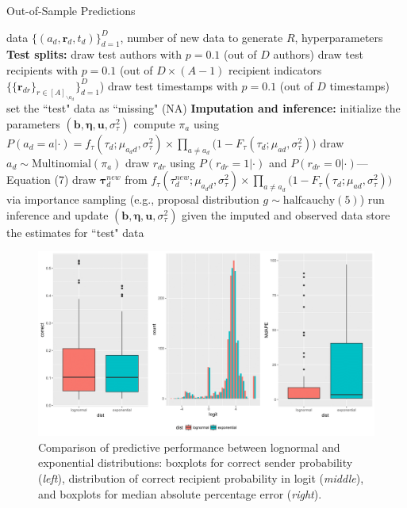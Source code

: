 \documentclass[12pt]{article}
\begin{document}
		\begin{algorithm}[!t]
			\caption{Out-of-Sample Predictions}
			\label{alg:PPE}
			\begin{algorithmic}
				 data $ \{ (a_d, \boldsymbol{r}_d, t_d)\}_{d=1}^D$, 
				number of new data to generate $R$,
				hyperparameters
				\vskip 0.1in
				\textbf{Test splits:}	
				\STATE draw test authors with $p=0.1$ (out of $D$ authors) 
				\STATE draw test recipients
				with $p=0.1$ (out of $D\times (A-1)$ recipient indicators $\{\{\boldsymbol{r}_{dr}\}_{r\in [A]_{\backslash a_d}}\}_{d=1}^D$)
				\STATE draw test timestamps with $p=0.1$  (out of $D$ timestamps) 
				\STATE set the ``test" data as ``missing" (NA)
				\vskip 0.1in
				\textbf{Imputation and inference:}	
				\STATE initialize the parameters $(\boldsymbol{b}, \boldsymbol{\eta}, \boldsymbol{u}, \sigma^2_\tau)$
				\STATE compute $\pi_{a} $ using $P(a_d= a | \cdot)=f_{\tau}(\tau_{d}; \mu_{a_dd}, \sigma_\tau^2)\times \prod_{a\neq a_d}\big(1-F_{\tau}(\tau_{d}; \mu_{a d}, \sigma_\tau^2) \big)$
				\ENDFOR
				\STATE draw $a_d \sim \mbox{Multinomial}(\pi_a)$
				\ENDIF
				\STATE draw $r_{dr}$ using $P(r_{dr}= 1 | \cdot)$ and $P(r_{dr}= 0| \cdot)$---Equation (7)
				\ENDIF
				\ENDFOR
				\STATE draw $\boldsymbol{\tau}^{new}_d$ from $f_{\tau}(\tau^{new}_{d}; \mu_{a_d d}, \sigma_\tau^2)\times \prod_{a\neq a_d}\big(1-F_{\tau}(\tau_{d}; \mu_{a d}, \sigma_\tau^2) \big)$ via importance sampling (e.g., proposal distribution $g \sim \mbox{halfcauchy}(5)$)
				\ENDIF
				\STATE run inference and update $(\boldsymbol{b}, \boldsymbol{\eta},\boldsymbol{u}, \sigma^2_\tau)$ given the imputed and observed data
				\ENDFOR
				\STATE store the estimates for ``test" data
				\ENDFOR
			\end{algorithmic}
		\end{algorithm}
	\begin{figure}[!t]
		\centering
		\includegraphics[width=1\textwidth]{plots_paper/PPEplot-1.png}	
		\caption {Comparison of predictive performance between lognormal and exponential distributions: boxplots for correct sender probability (\textit{left}), distribution of correct recipient probability in logit (\textit{middle}), and boxplots for median absolute percentage error (\textit{right}).}
		\label{figure:PPEresults}
	\end{figure}
\end{document}
